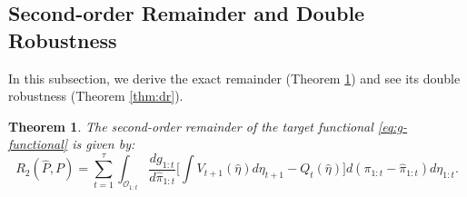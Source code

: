 \documentclass{article}
\theoremstyle{plain}
\newtheorem{theorem}{Theorem}[section]
\theoremstyle{definition}
\theoremstyle{remark}
\begin{document}
\subsection{Second-order Remainder and Double Robustness}

\label{sec:dr}

In this subsection, we derive the exact remainder (Theorem \ref{thm:R2}) and see its double robustness (Theorem \ref{thm:dr}).

\begin{theorem}
    \label{thm:R2}
    The second-order remainder of the target functional \eqref{eq:g-functional} is given by:
    \begin{equation}
        \label{eq:R2}
        R_2(\hat{P},P)=\sum_{t=1}^\tau\int_{\mathcal{O}_{1:t}}\frac{dg_{1:t}}{d\hat{\pi}_{1:t}}\Big[\int V_{t+1}(\hat{\eta})d\eta_{t+1}-Q_{t}(\hat{\eta})\Big]d(\pi_{1:t}-\hat{\pi}_{1:t})d\eta_{1:t}.
    \end{equation}
\end{theorem}
\end{document}
